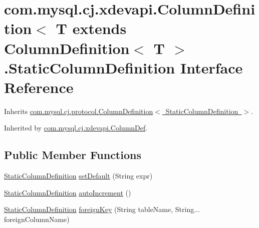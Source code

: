 \hypertarget{interfacecom_1_1mysql_1_1cj_1_1xdevapi_1_1_column_definition_1_1_static_column_definition}{}\section{com.\+mysql.\+cj.\+xdevapi.\+Column\+Definition$<$ T extends Column\+Definition$<$ T $>$.Static\+Column\+Definition Interface Reference}
\label{interfacecom_1_1mysql_1_1cj_1_1xdevapi_1_1_column_definition_1_1_static_column_definition}


Inherits \mbox{\hyperlink{interfacecom_1_1mysql_1_1cj_1_1protocol_1_1_column_definition}{com.\+mysql.\+cj.\+protocol.\+Column\+Definition$<$ Static\+Column\+Definition $>$}}.



Inherited by \mbox{\hyperlink{classcom_1_1mysql_1_1cj_1_1xdevapi_1_1_column_def}{com.\+mysql.\+cj.\+xdevapi.\+Column\+Def}}.

\subsection*{Public Member Functions}
\begin{DoxyCompactItemize}
\item 
\mbox{\hyperlink{interfacecom_1_1mysql_1_1cj_1_1xdevapi_1_1_column_definition_1_1_static_column_definition}{Static\+Column\+Definition}} \mbox{\hyperlink{interfacecom_1_1mysql_1_1cj_1_1xdevapi_1_1_column_definition_1_1_static_column_definition_a0ac0436ab3288cb50a8dd10f4a9c8afc}{set\+Default}} (String expr)
\item 
\mbox{\hyperlink{interfacecom_1_1mysql_1_1cj_1_1xdevapi_1_1_column_definition_1_1_static_column_definition}{Static\+Column\+Definition}} \mbox{\hyperlink{interfacecom_1_1mysql_1_1cj_1_1xdevapi_1_1_column_definition_1_1_static_column_definition_acc7d2520272cb72fb38d458464886995}{auto\+Increment}} ()
\item 
\mbox{\hyperlink{interfacecom_1_1mysql_1_1cj_1_1xdevapi_1_1_column_definition_1_1_static_column_definition}{Static\+Column\+Definition}} \mbox{\hyperlink{interfacecom_1_1mysql_1_1cj_1_1xdevapi_1_1_column_definition_1_1_static_column_definition_a38a6faaed72d2f87e2d724da689fe8d2}{foreign\+Key}} (String table\+Name, String... foreign\+Column\+Name)
\end{DoxyCompactItemize}


